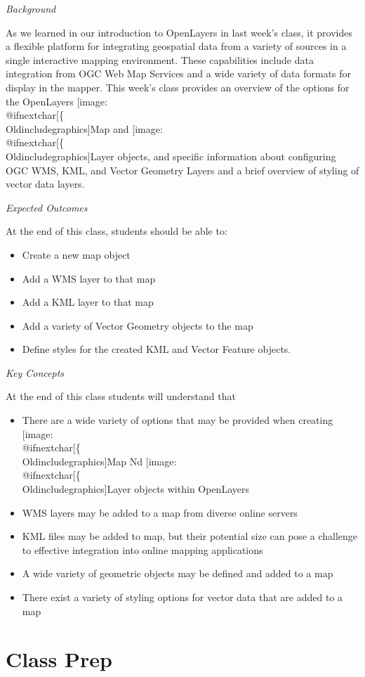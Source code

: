 \documentclass[]{book}
\makeatletter
\providecommand{\tightlist}{%
  \setlength{\itemsep}{0pt}\setlength{\parskip}{0pt}}
\def\ScaleIfNeeded{%
  \ifdim\Gin@nat@width>.5\linewidth
    .5\linewidth
  \else
    \Gin@nat@width
  \fi
}
\let\Oldincludegraphics\texttt{[image: \%
 \\catcode`\\@=11\\relax\%
 \%\\gdef\\includegraphics\{\\@ifnextchar[\{\\Oldincludegraphics]}{\Oldincludegraphics[width=\ScaleIfNeeded]}}%
\gdef\texttt{[image: \\@ifnextchar[\{\\Oldincludegraphics]}{\Oldincludegraphics[max size={.75\textwidth}{.75\textheight}]}}%
\makeatother
\begin{document}
\emph{Background}

As we learned in our introduction to OpenLayers in last week's class, it
provides a flexible platform for integrating geospatial data from a
variety of sources in a single interactive mapping environment. These
capabilities include data integration from OGC Web Map Services and a
wide variety of data formats for display in the mapper. This week's
class provides an overview of the options for the OpenLayers
\texttt{Map} and \texttt{Layer} objects, and specific information about
configuring OGC WMS, KML, and Vector Geometry Layers and a brief
overview of styling of vector data layers.

\emph{Expected Outcomes}

At the end of this class, students should be able to:

\begin{itemize}
\tightlist
\item
  Create a new map object
\item
  Add a WMS layer to that map
\item
  Add a KML layer to that map
\item
  Add a variety of Vector Geometry objects to the map
\item
  Define styles for the created KML and Vector Feature objects.
\end{itemize}

\emph{Key Concepts }

At the end of this class students will understand that

\begin{itemize}
\tightlist
\item
  There are a wide variety of options that may be provided when creating
  \texttt{Map} Nd \texttt{Layer} objects within OpenLayers
\item
  WMS layers may be added to a map from diverse online servers
\item
  KML files may be added to map, but their potential size can pose a
  challenge to effective integration into online mapping applications
\item
  A wide variety of geometric objects may be defined and added to a map
\item
  There exist a variety of styling options for vector data that are
  added to a map
\end{itemize}

\section{Class Prep}\label{week11-prep}
\end{document}
